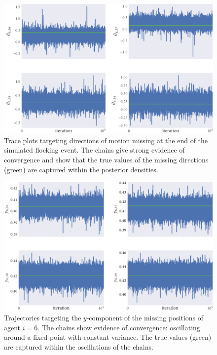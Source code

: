 \begin{figure}[tbp]
  \includegraphics{end/dir_trace.pdf}
  \caption{Trace plots targeting directions of motion missing at the end of the
    simulated flocking event. The chains give strong evidence of convergence and
    show that the true values of the missing directions (green) are captured within
    the posterior densities.}
  \label{fig:end_dir_trace}
\end{figure}
\begin{figure}[tbp]
  \includegraphics{end/y_trace.pdf}
  \caption{Trajectories targeting the $y$-component of the missing positions of
    agent $i=6$. The chains show evidence of convergence: oscillating around
    a fixed point with constant variance. The true values (green) are
    captured within the oscillations of the chains.}
  \label{fig:end_y_trace}
\end{figure}
